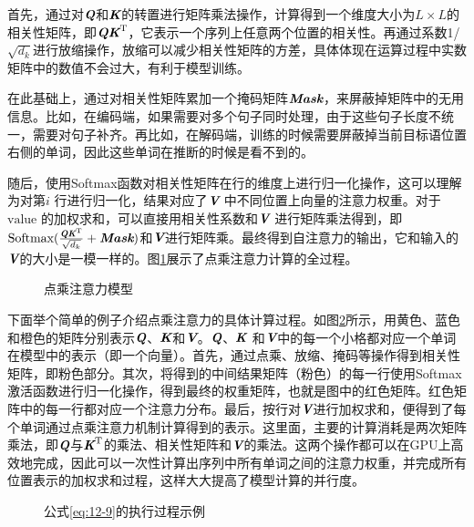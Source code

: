 \noindent 首先，通过对$\textbf{\em Q}$和$\textbf{\em K}$的转置进行矩阵乘法操作，计算得到一个维度大小为$L \times L$的相关性矩阵，即$\textbf{\em Q}\textbf{\em K}^{\textrm{T}}$，它表示一个序列上任意两个位置的相关性。再通过系数1/$\sqrt{d_k}$进行放缩操作，放缩可以减少相关性矩阵的方差，具体体现在运算过程中实数矩阵中的数值不会过大，有利于模型训练。

\parinterval 在此基础上，通过对相关性矩阵累加一个掩码矩阵$\textbf{\em Mask}$，来屏蔽掉矩阵中的无用信息。比如，在编码端，如果需要对多个句子同时处理，由于这些句子长度不统一，需要对句子补齐。再比如，在解码端，训练的时候需要屏蔽掉当前目标语位置右侧的单词，因此这些单词在推断的时候是看不到的。

\parinterval 随后，使用Softmax函数对相关性矩阵在行的维度上进行归一化操作，这可以理解为对第$i$ 行进行归一化，结果对应了$\textbf{\em V}$ 中不同位置上向量的注意力权重。对于$\mathrm{value}$ 的加权求和，可以直接用相关性系数和$\textbf{\em V}$ 进行矩阵乘法得到，即$\textrm{Softmax}
 ( \frac{\textbf{\em Q}\textbf{\em K}^{\textrm{T}}} {\sqrt{d_k}} + \textbf{\em Mask} )$和$\textbf{\em V}$进行矩阵乘。最终得到自注意力的输出，它和输入的$\textbf{\em V}$的大小是一模一样的。图\ref{fig:12-10}展示了点乘注意力计算的全过程。

\begin{figure}[htp]
\centering

\caption{点乘注意力模型 }
\label{fig:12-10}
\end{figure}

\parinterval 下面举个简单的例子介绍点乘注意力的具体计算过程。如图\ref{fig:12-11}所示，用黄色、蓝色和橙色的矩阵分别表示$\textbf{\em Q}$、$\textbf{\em K}$和$\textbf{\em V}$。$\textbf{\em Q}$、$\textbf{\em K}$ 和$\textbf{\em V}$中的每一个小格都对应一个单词在模型中的表示（即一个向量）。首先，通过点乘、放缩、掩码等操作得到相关性矩阵，即粉色部分。其次，将得到的中间结果矩阵（粉色）的每一行使用Softmax激活函数进行归一化操作，得到最终的权重矩阵，也就是图中的红色矩阵。红色矩阵中的每一行都对应一个注意力分布。最后，按行对$\textbf{\em V}$进行加权求和，便得到了每个单词通过点乘注意力机制计算得到的表示。这里面，主要的计算消耗是两次矩阵乘法，即$\textbf{\em Q}$与$\textbf{\em K}^{\textrm{T}}$的乘法、相关性矩阵和$\textbf{\em V}$的乘法。这两个操作都可以在GPU上高效地完成，因此可以一次性计算出序列中所有单词之间的注意力权重，并完成所有位置表示的加权求和过程，这样大大提高了模型计算的并行度。

\begin{figure}[htp]
\centering

\caption{公式\eqref{eq:12-9}的执行过程示例}
\label{fig:12-11}
\end{figure}

